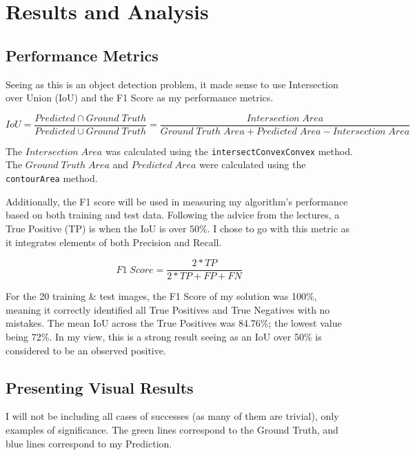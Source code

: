 \documentclass{article}  %
\begin{document}
	\section{Results and Analysis}
	
	\subsection{Performance Metrics}
	
	Seeing as this is an object detection problem, it made sense to use Intersection over Union (IoU) and the F1 Score as my performance metrics.
	
	\[ IoU = \frac{Predicted \cap Ground\; Truth}{Predicted \cup Ground\; Truth} = \frac{Intersection\; Area}{Ground\; Truth\; Area + Predicted\; Area - Intersection\; Area} \]
	
	The $Intersection\; Area$ was calculated using the \verb|intersectConvexConvex| method. The $Ground\; Truth\; Area$ and $Predicted\; Area$ were calculated using the \verb|contourArea| method.\newline
	
	Additionally, the F1 score will be used in measuring my algorithm's performance based on both training and test data. Following the advice from the lectures, a True Positive (TP) is when the IoU is over $50\%$. I chose to go with this metric as it integrates elements of both Precision and Recall.
	
	\[ F1\; Score = \frac{2*TP}{2*TP+FP+FN} \]
	
	For the 20 training \& test images, the F1 Score of my solution was 100\%, meaning it correctly identified all True Positives and True Negatives with no mistakes. The mean IoU across the True Positives was 84.76\%; the lowest value being 72\%. In my view, this is a strong result seeing as an IoU over 50\% is considered to be an observed positive.
	
	\newpage
	\subsection{Presenting Visual Results}
	
	I will not be including all cases of successes (as many of them are trivial), only examples of significance. The green lines correspond to the Ground Truth, and blue lines correspond to my Prediction.
	
\end{document}
